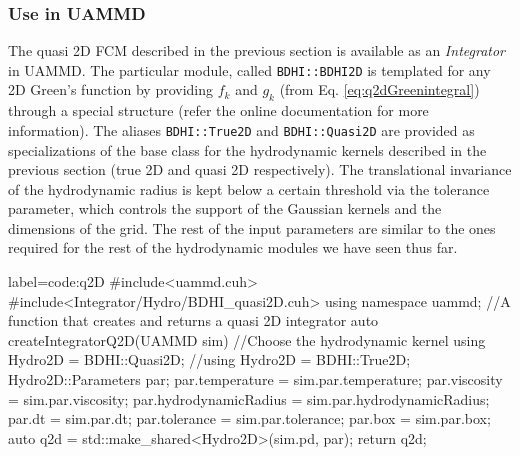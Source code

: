 \documentclass[twoside,openright,titlepage,numbers=noenddot,%
headinclude,footinclude,cleardoublepage=empty,abstract=on,
BCOR=5mm,fontsize=11pt, dvipsnames, paper=b5
]{scrreprt}
\def\ucpp{uammd_cpp_lexer.py:UAMMDCppLexer -x}
\newcommand{\uammd}{\gls{UAMMD}\xspace}
\begin{document}
\subsubsection*{Use in UAMMD}
The quasi 2D \gls{FCM} described in the previous section is available as an \emph{Integrator} in \uammd. The particular module, called \texttt{BDHI::BDHI2D} is templated for any 2D Green's function by providing $f_k$ and $g_k$ (from Eq. \eqref{eq:q2dGreenintegral}) through a special structure (refer the online documentation for more information). The aliases \texttt{BDHI::True2D} and \texttt{BDHI::Quasi2D} are provided as specializations of the base class for the hydrodynamic kernels described in the previous section (true 2D and quasi 2D respectively).
The translational invariance of the hydrodynamic radius is kept below a certain threshold via the tolerance parameter, which controls the support of the Gaussian kernels and the dimensions of the grid.
The rest of the input parameters are similar to the ones required for the rest of the hydrodynamic modules we have seen thus far.
\begin{code2}{label=code:q2D}
#include<uammd.cuh>
#include<Integrator/Hydro/BDHI_quasi2D.cuh>
using namespace uammd;
//A function that creates and returns a quasi 2D integrator
auto createIntegratorQ2D(UAMMD sim){
  //Choose the hydrodynamic kernel
  using Hydro2D = BDHI::Quasi2D;
  //using Hydro2D = BDHI::True2D;
  Hydro2D::Parameters par;
  par.temperature = sim.par.temperature;
  par.viscosity = sim.par.viscosity;
  par.hydrodynamicRadius = sim.par.hydrodynamicRadius;
  par.dt = sim.par.dt;
  par.tolerance = sim.par.tolerance;
  par.box = sim.par.box;
  auto q2d = std::make_shared<Hydro2D>(sim.pd, par);
  return q2d;
}
\end{code2}

\newpage
\end{document}
